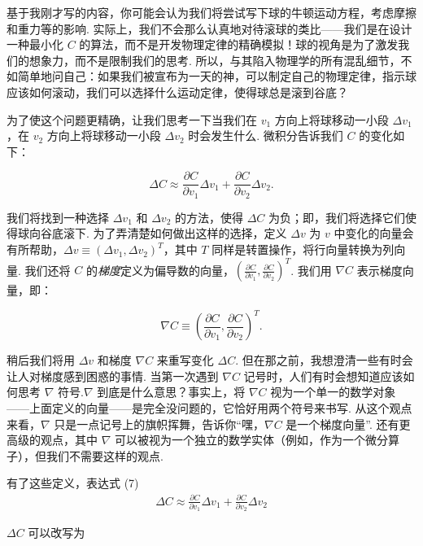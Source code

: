 基于我刚才写的内容，你可能会认为我们将尝试写下球的牛顿运动方程，考虑摩擦和重力等的影响. 实际上，我们不会那么认真地对待滚球的类比——我们是在设计一种最小化 $C$ 的算法，而不是开发物理定律的精确模拟！球的视角是为了激发我们的想象力，而不是限制我们的思考. 所以，与其陷入物理学的所有混乱细节，不如简单地问自己：如果我们被宣布为一天的神，可以制定自己的物理定律，指示球应该如何滚动，我们可以选择什么运动定律，使得球总是滚到谷底？

为了使这个问题更精确，让我们思考一下当我们在 $v_1$ 方向上将球移动一小段 $\Delta v_1$，在 $v_2$ 方向上将球移动一小段 $\Delta v_2$ 时会发生什么. 微积分告诉我们 $C$ 的变化如下：

\begin{equation}
\Delta C \approx \frac{\partial C}{\partial v_1} \Delta v_1 + \frac{\partial C}{\partial v_2} \Delta v_2.
\tag{7}
\end{equation}

\noindent 我们将找到一种选择 $\Delta v_1$ 和 $\Delta v_2$ 的方法，使得 $\Delta C$ 为负；即，我们将选择它们使得球向谷底滚下. 为了弄清楚如何做出这样的选择，定义 $\Delta v$ 为 $v$ 中变化的向量会有所帮助，$\Delta v \equiv (\Delta v_1, \Delta v_2)^T$，其中 $T$ 同样是转置操作，将行向量转换为列向量. 我们还将 $C$ 的\emph{梯度}定义为偏导数的向量，$\left(\frac{\partial C}{\partial v_1}, \frac{\partial C}{\partial v_2}\right)^T$. 我们用 $\nabla C$ 表示梯度向量，即：

\begin{equation}
\nabla C \equiv \left( \frac{\partial C}{\partial v_1}, \frac{\partial C}{\partial v_2} \right)^T.
\tag{8}
\end{equation}

\noindent 稍后我们将用 $\Delta v$ 和梯度 $\nabla C$ 来重写变化 $\Delta C$. 但在那之前，我想澄清一些有时会让人对梯度感到困惑的事情. 当第一次遇到 $\nabla C$ 记号时，人们有时会想知道应该如何思考 $\nabla$ 符号.$\nabla$ 到底是什么意思？事实上，将 $\nabla C$ 视为一个单一的数学对象——上面定义的向量——是完全没问题的，它恰好用两个符号来书写. 从这个观点来看，$\nabla$ 只是一点记号上的旗帜挥舞，告诉你“嘿，$\nabla C$ 是一个梯度向量”. 还有更高级的观点，其中 $\nabla$ 可以被视为一个独立的数学实体（例如，作为一个微分算子），但我们不需要这样的观点.

有了这些定义，表达式 (7)
\begin{align*}
\Delta C \approx \frac{\partial C}{\partial v_1} \Delta v_1 + \frac{\partial C}{\partial v_2} \Delta v_2 \nonumber
\end{align*}

\noindent $\Delta C$ 可以改写为

